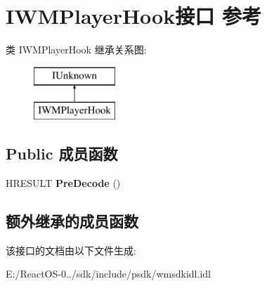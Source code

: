 \hypertarget{interface_i_w_m_player_hook}{}\section{I\+W\+M\+Player\+Hook接口 参考}
\label{interface_i_w_m_player_hook}
类 I\+W\+M\+Player\+Hook 继承关系图\+:\begin{figure}[H]
\begin{center}
\leavevmode
\includegraphics[height=2.000000cm]{interface_i_w_m_player_hook}
\end{center}
\end{figure}
\subsection*{Public 成员函数}
\begin{DoxyCompactItemize}
\item 
\mbox{\label{interface_i_w_m_player_hook_ac1ed8acef3b7287e2f31eb44d73efa41}} 
H\+R\+E\+S\+U\+LT {\bfseries Pre\+Decode} ()
\end{DoxyCompactItemize}
\subsection*{额外继承的成员函数}


该接口的文档由以下文件生成\+:\begin{DoxyCompactItemize}
\item 
E\+:/\+React\+O\+S-\/0../sdk/include/psdk/wmsdkidl.\+idl\end{DoxyCompactItemize}
